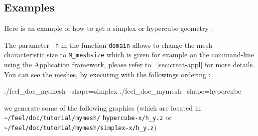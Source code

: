 


%


\subsection{Examples}
\label{mesh:examples}
Here is an example of how to get a simplex or hypercube geometry :


The parameter \lstinline!_h! in the function \lstinline!domain! allows to change the mesh characteristic size to \lstinline!M_meshsize! which is given for example on the command-line using the Application framework, please refer to ~\ref{sec:creat-appl} for more details. You can see the meshes, by executing with the followings ordering :

\begin{unixcom}
		./feel_doc_mymesh --shape=simplex
		./feel_doc_mymesh --shape=hypercube
\end{unixcom}
we generate some of the following graphics (which are located in \verb|~/feel/doc/tutorial/mymesh/| \newline \verb|hypercube-x/h_y.z| or \verb|~/feel/doc/tutorial/mymesh/simplex-x/h_y.z|)

